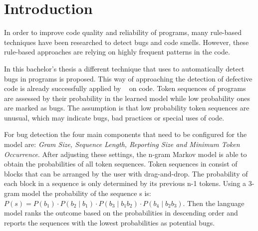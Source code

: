 \chapter{Introduction}\label{chap:introduction}

In order to improve code quality and reliability of programs, many rule-based techniques have been researched to detect bugs and code smells. However, these rule-based approaches are relying on highly frequent patterns in the code. 

In this bachelor's thesis a different technique that uses  to automatically detect bugs in \scratch{} programs is proposed. This way of approaching the detection of defective code is already successfully applied by \bugram{}~\cite{bugram} on \java{} code. Token sequences of programs are assessed by their probability in the learned model while low probability ones are marked as bugs. The assumption is that low probability token sequences are unusual, which may indicate bugs, bad practices or special uses of code. 

For bug detection the four main components that need to be configured for the model are: \textit{Gram Size, Sequence Length, Reporting Size and Minimum Token Occurrence}. After adjusting these settings, the n-gram Markov model is able to obtain the probabilities of all token sequences. Token sequences in \scratch{} consist of blocks that can be arranged by the user with drag-and-drop. The probability of each block in a sequence is only determined by its previous n-1 tokens. Using a 3-gram model the probability of the sequence s is: \(P(s) = P(b_{1})\cdot P(b_{2}\mid b_{1})\cdot P(b_{3}\mid b_{1}b_{2})\cdot P(b_{4}\mid b_{2}b_{3}) \). Then the language model ranks the outcome based on the probabilities in descending order and reports the sequences with the lowest probabilities as potential bugs. 